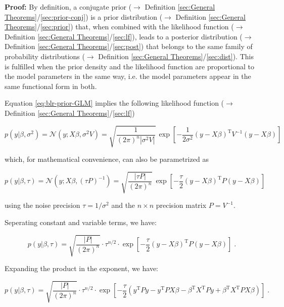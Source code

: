 \documentclass[a4paper,12pt,twoside]{book}
\begin{document}
\vspace{1em}
\textbf{Proof:} By definition, a conjugate prior ($\rightarrow$ Definition \ref{sec:General Theorems}/\ref{sec:prior-conj}) is a prior distribution ($\rightarrow$ Definition \ref{sec:General Theorems}/\ref{sec:prior}) that, when combined with the likelihood function ($\rightarrow$ Definition \ref{sec:General Theorems}/\ref{sec:lf}), leads to a posterior distribution ($\rightarrow$ Definition \ref{sec:General Theorems}/\ref{sec:post}) that belongs to the same family of probability distributions ($\rightarrow$ Definition \ref{sec:General Theorems}/\ref{sec:dist}). This is fulfilled when the prior density and the likelihood function are proportional to the model parameters in the same way, i.e. the model parameters appear in the same functional form in both.

Equation \eqref{eq:blr-prior-GLM} implies the following likelihood function ($\rightarrow$ Definition \ref{sec:General Theorems}/\ref{sec:lf})

\begin{equation} \label{eq:blr-prior-GLM-LF-class}
p(y|\beta,\sigma^2) = \mathcal{N}(y; X \beta, \sigma^2 V) = \sqrt{\frac{1}{(2 \pi)^n |\sigma^2 V|}} \, \exp\left[ -\frac{1}{2 \sigma^2} (y-X\beta)^\mathrm{T} V^{-1} (y-X\beta) \right]
\end{equation}

which, for mathematical convenience, can also be parametrized as

\begin{equation} \label{eq:blr-prior-GLM-LF-Bayes}
p(y|\beta,\tau) = \mathcal{N}(y; X \beta, (\tau P)^{-1}) = \sqrt{\frac{|\tau P|}{(2 \pi)^n}} \, \exp\left[ -\frac{\tau}{2} (y-X\beta)^\mathrm{T} P (y-X\beta) \right]
\end{equation}

using the noise precision $\tau = 1/\sigma^2$ and the $n \times n$ precision matrix $P = V^{-1}$.

\vspace{1em}
Seperating constant and variable terms, we have:

\begin{equation} \label{eq:blr-prior-GLM-LF-s1}
p(y|\beta,\tau) = \sqrt{\frac{|P|}{(2 \pi)^n}} \cdot \tau^{n/2} \cdot \exp\left[ -\frac{\tau}{2} (y-X\beta)^\mathrm{T} P (y-X\beta) \right] \; .
\end{equation}

Expanding the product in the exponent, we have:

\begin{equation} \label{eq:blr-prior-GLM-LF-s2}
p(y|\beta,\tau) = \sqrt{\frac{|P|}{(2 \pi)^n}} \cdot \tau^{n/2} \cdot \exp\left[ -\frac{\tau}{2} \left( y^\mathrm{T} P y - y^\mathrm{T} P X \beta - \beta^\mathrm{T} X^\mathrm{T} P y + \beta^\mathrm{T} X^\mathrm{T} P X \beta \right) \right] \; .
\end{equation}
\end{document}
